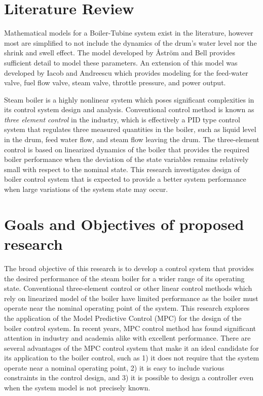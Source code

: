 \section{Literature Review}


Mathematical models for a Boiler-Tubine system exist in the literature, however most are simplified to not include the dynamics of the drum's water level nor the shrink and swell effect. The model developed by \r{A}str\"{o}m and Bell \cite{Astrom} provides sufficient detail to model these parameters.
An extension of this model was developed by Iacob and Andreescu \cite{Iacob} which provides modeling for the feed-water valve, fuel flow valve, steam valve, throttle pressure, and power output. 

Steam boiler is a highly nonlinear system which poses significant complexities in its control system design and analysis.  Conventional control method is known as {\it three element control} in the industry, which is effectively a PID type control system that regulates three measured quantities in the boiler, such as liquid level in the drum, feed water flow, and steam flow leaving the drum.  The three-element control is based on linearized dynamics of the boiler that provides the required boiler performance when the deviation of the state variables remains relatively small with respect to the nominal state.  This research investigates design of boiler control system that is expected to provide a better system performance when large variations of the system state may occur.



\section{Goals and Objectives of proposed research}


The broad objective of this research is to develop a control system that provides the desired performance of the steam boiler for a wider range of its operating state.  Conventional three-element control or other linear control methods which rely on linearized model of the boiler have limited performance as the boiler must operate near the nominal operating point of the system.  This research explores the application of the Model Predictive Control (MPC) for the design of the boiler control system.  In recent years, MPC control method has found significant attention in industry \cite{Wang, Forbes, Zang, Botelho} and academia \cite{Saltık, Ghosh, Song} alike with excellent performance.  There are several advantages of the MPC control system that make it an ideal candidate for its application to the boiler control, such as 1) it does not require that the system operate near a nominal operating point, 2) it is easy to include various constraints in the control design, and 3) it is possible to design a controller even when the system model is not precisely known.

